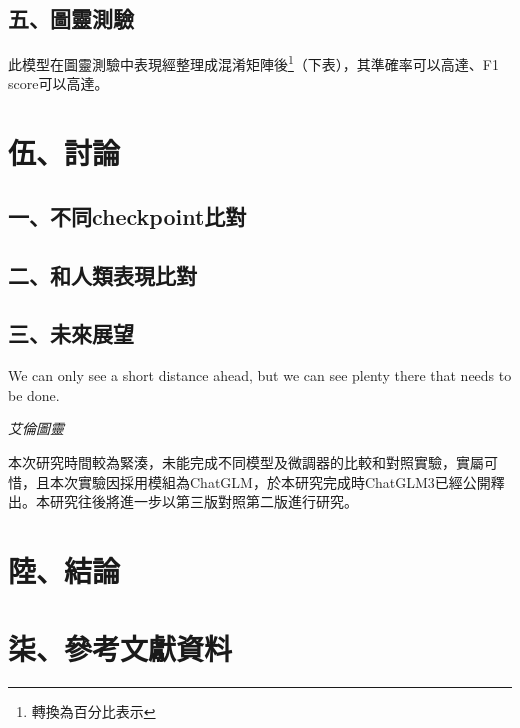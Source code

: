 \documentclass[8pt,a4paper,新細明體,UTF8,natbib]{article}
\begin{document}
\begin{CJK*}{UTF8}{bsmi}
	\subsection{五、圖靈測驗}
	此模型在圖靈測驗中表現經整理成混淆矩陣後\footnote{轉換為百分比表示}（下表），其準確率可以高達、F1 score可以高達。
	
	\section{伍、討論}
	\subsection{一、不同checkpoint比對}
	\subsection{二、和人類表現比對}
	\subsection{三、未來展望}
\epigraph{	We can only see a short distance ahead, but we can see plenty there that needs to be done.}{\textit{艾倫圖靈}}
	本次研究時間較為緊湊，未能完成不同模型及微調器的比較和對照實驗，實屬可惜，且本次實驗因採用模組為ChatGLM，於本研究完成時ChatGLM3已經公開釋出。本研究往後將進一步以第三版對照第二版進行研究。
	\section{陸、結論}

	\section{柒、參考文獻資料}

\renewcommand{\refname}{}

\end{CJK*}
\end{document}
